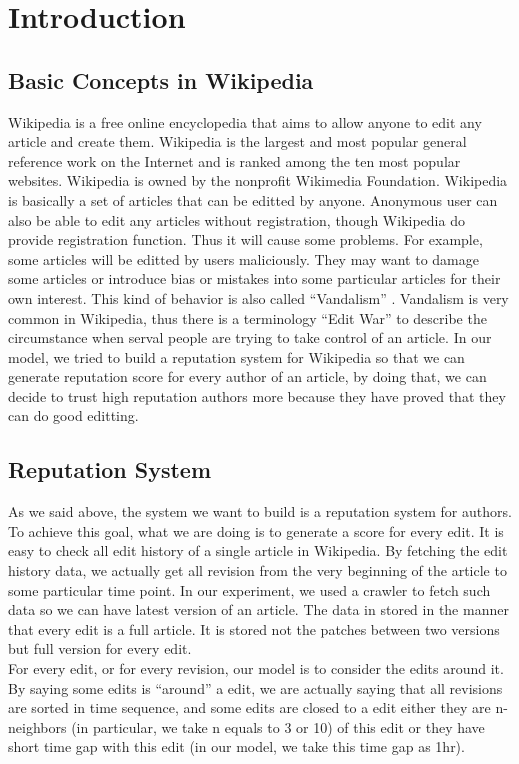 \documentclass[preprint,review,12pt]{elsarticle}
\begin{document}
\section{Introduction}
\subsection{Basic Concepts in Wikipedia}
Wikipedia is a free online encyclopedia that aims to allow anyone to edit any
article and create them. Wikipedia is the largest and most popular general
reference work on the Internet and is ranked among the ten most popular
websites. Wikipedia is owned by the nonprofit Wikimedia
Foundation.\cite{wiki:wiki} Wikipedia is basically a set of articles that can be
editted by anyone. Anonymous user can also be able to edit any articles without
registration, though Wikipedia do provide registration function.
Thus it will
cause some problems. For example, some
articles will be editted by users maliciously. They may want to damage some
articles or introduce bias or mistakes into some particular articles for their
own interest. This kind of behavior is also called ``Vandalism''
\cite{wiki:vandalism}. Vandalism is very common in Wikipedia, thus there is a
terminology ``Edit War''\cite{wiki:edit_war} to describe the circumstance when
serval people are trying to take control of an article. In our model, we tried
to build a reputation system for Wikipedia so that we can generate reputation
score for every author of an article, by doing that, we can decide to trust high
reputation authors more because they have proved that they can do good editting.
\subsection{Reputation System}
As we said above, the system we want to build is a reputation system for
authors. To achieve this goal, what we are doing is to generate a score for
every edit. It is easy to check all edit history of a single article in
Wikipedia. By fetching the edit history data, we actually get all revision from
the very beginning of the article to some particular time point. In our
experiment, we used a crawler to fetch such data so we can have latest version
of an article. The data in stored in the manner that every edit is a full
article. It is stored not the patches between two versions but full version for
every edit. \\
For every edit, or for every revision, our model is to consider the edits around
it. By saying some edits is ``around'' a edit, we are actually saying that
all revisions are sorted in time sequence, and some edits are closed to a edit
either they are n-neighbors (in particular, we take n equals to 3 or 10) of this
edit or they have short time gap with this edit (in our model, we take this time
gap as 1hr).
\end{document}
